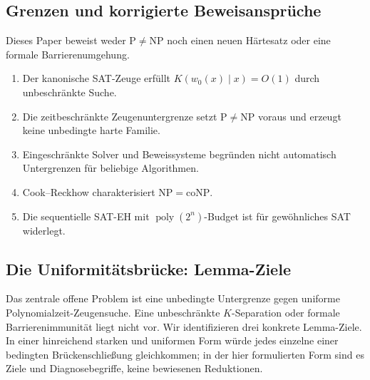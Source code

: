 \documentclass[aps,prd,twocolumn,superscriptaddress,nofootinbib]{revtex4-2}
\theoremstyle{definition}
\theoremstyle{remark}
\DeclareMathOperator{\poly}{poly}
\newcommand{\NP}{\mathrm{NP}}
\newcommand{\PP}{\mathrm{P}}
\newcommand{\coNP}{\mathrm{coNP}}
\begin{document}
\begin{table}[htbp]
\caption{Struktureller Vergleich nicht-negativer Grö\ss{}en und fehlender Kopplungen.}
\label{tab:missing-couplings}
\centering
{}
\end{table}

\subsection{Grenzen und korrigierte Beweisansprüche}
Dieses Paper beweist weder $\PP\ne\NP$ noch einen
neuen Härtesatz oder eine formale Barrierenumgehung.
\begin{enumerate}
\item Der kanonische SAT-Zeuge erfüllt
$K(w_0(x)\mid x)=O(1)$ durch unbeschränkte Suche.
\item Die zeitbeschränkte Zeugenuntergrenze setzt $\PP\ne\NP$
voraus und erzeugt keine unbedingte harte Familie.
\item Eingeschränkte Solver und Beweissysteme begründen
nicht automatisch Untergrenzen für beliebige Algorithmen.
\item Cook--Reckhow charakterisiert $\NP=\coNP$.
\item Die sequentielle SAT-EH mit $\poly(2^n)$-Budget
ist für gewöhnliches SAT widerlegt.
\end{enumerate}

\subsection{Die Uniformitätsbrücke: Lemma-Ziele}
\label{sec:uniformity-bridge}

Das zentrale offene Problem ist eine unbedingte Untergrenze gegen uniforme Polynomialzeit-Zeugensuche. Eine unbeschränkte $K$-Separation oder formale Barrierenimmunität liegt nicht vor. Wir identifizieren drei konkrete Lemma-Ziele. In einer hinreichend starken und uniformen Form würde jedes einzelne einer bedingten Brückenschließung gleichkommen; in der hier formulierten Form sind es Ziele und Diagnosebegriffe, keine bewiesenen Reduktionen.
\end{document}
